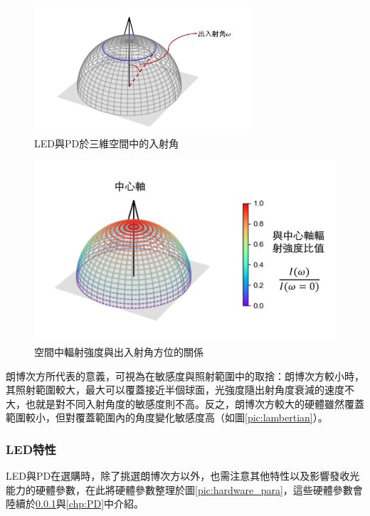         \begin{figure}[ht]
            \centering
            \includegraphics[width=8cm]{ch2pic/3d_angle.png}
            \caption{LED與PD於三維空間中的入射角}
            \label{pic:angle_3d}
        \end{figure}

        \begin{figure}[ht]
            \centering
            \includegraphics[width=12cm]{ch2pic/lambertian_3d.png}
            \caption{空間中輻射強度與出入射角方位的關係}
            \label{pic:lambertian_3d}
        \end{figure}

        朗博次方所代表的意義，可視為在敏感度與照射範圍中的取捨：朗博次方較小時，其照射範圍較大，最大可以覆蓋接近半個球面，光強度隨出射角度衰減的速度不大，也就是對不同入射角度的敏感度則不高。反之，朗博次方較大的硬體雖然覆蓋範圍較小，但對覆蓋範圍內的角度變化敏感度高（如圖\ref{pic:lambertian}）。

        

        \subsubsection{LED特性}
        \label{chp:LED}

        LED與PD在選購時，除了挑選朗博次方以外，也需注意其他特性以及影響發收光能力的硬體參數，在此將硬體參數整理於圖\ref{pic:hardware_para}，這些硬體參數會陸續於\ref{chp:LED}與\ref{chp:PD}中介紹。
        
